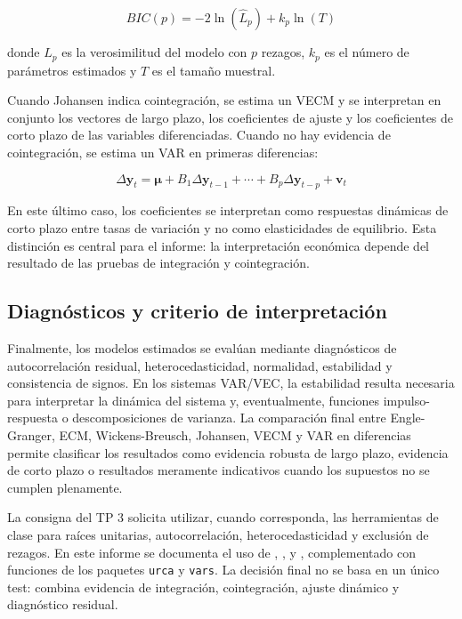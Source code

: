 \documentclass[11pt,a4paper]{article}
\begin{document}
	\begin{equation}
		BIC(p) = -2\ln(\widehat{L}_p) + k_p\ln(T)
		\label{eq:tp3-bic}
	\end{equation}

	donde \(\widehat{L}_p\) es la verosimilitud del modelo con \(p\) rezagos,
	\(k_p\) es el número de parámetros estimados y \(T\) es el tamaño muestral.

	Cuando Johansen indica cointegración, se estima un VECM y se interpretan en
	conjunto los vectores de largo plazo, los coeficientes de ajuste y los
	coeficientes de corto plazo de las variables diferenciadas. Cuando no hay
	evidencia de cointegración, se estima un VAR en primeras diferencias:

	\begin{equation}
		\Delta \mathbf{y}_t
		= \boldsymbol{\mu}
		+ B_1\Delta \mathbf{y}_{t-1}
		+ \cdots
		+ B_p\Delta \mathbf{y}_{t-p}
		+ \mathbf{v}_t
		\label{eq:tp3-var-diferencias}
	\end{equation}

	En este último caso, los coeficientes se interpretan como respuestas dinámicas
	de corto plazo entre tasas de variación y no como elasticidades de equilibrio.
	Esta distinción es central para el informe: la interpretación económica depende
	del resultado de las pruebas de integración y cointegración.

	\subsection{Diagnósticos y criterio de interpretación}
	\label{subsec:metodologia-diagnosticos}

	Finalmente, los modelos estimados se evalúan mediante diagnósticos de
	autocorrelación residual, heterocedasticidad, normalidad, estabilidad y
	consistencia de signos. En los sistemas VAR/VEC, la estabilidad resulta
	necesaria para interpretar la dinámica del sistema y, eventualmente, funciones
	impulso-respuesta o descomposiciones de varianza. La comparación final entre
	Engle-Granger, ECM, Wickens-Breusch, Johansen, VECM y VAR en diferencias
	permite clasificar los resultados como evidencia robusta de largo plazo,
	evidencia de corto plazo o resultados meramente indicativos cuando los supuestos
	no se cumplen plenamente.

	La consigna del TP 3 solicita utilizar, cuando corresponda, las herramientas de
	clase para raíces unitarias, autocorrelación, heterocedasticidad y exclusión de
	rezagos. En este informe se documenta el uso de ,
	,  y
	, complementado con funciones de los paquetes
	\texttt{urca} y \texttt{vars}. La decisión final no se basa en un único test:
	combina evidencia de integración, cointegración, ajuste dinámico y diagnóstico
	residual.
\end{document}
